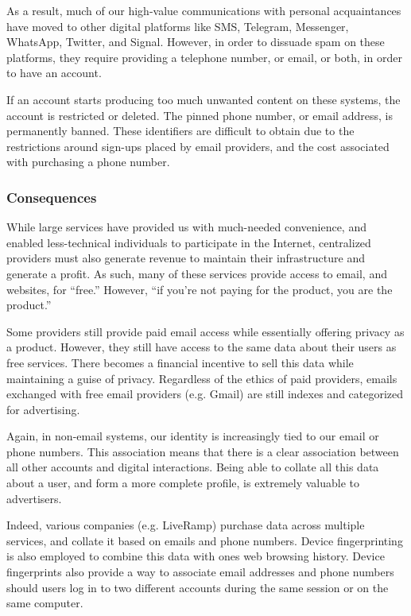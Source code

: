 \documentclass{article}
\begin{document}
As a result, much of our high-value communications with personal acquaintances have moved to other digital platforms like SMS, Telegram, Messenger, WhatsApp, Twitter, and Signal. However, in order to dissuade spam on these platforms, they require providing a telephone number, or email, or both, in order to have an account.

If an account starts producing too much unwanted content on these systems, the account is restricted or deleted. The pinned phone number, or email address, is permanently banned. These identifiers are difficult to obtain due to the restrictions around sign-ups placed by email providers, and the cost associated with purchasing a phone number.

\subsubsection{Consequences}

While large services have provided us with much-needed convenience, and enabled less-technical individuals to participate in the Internet, centralized providers must also generate revenue to maintain their infrastructure and generate a profit. As such, many of these services provide access to email, and websites, for ``free.'' However, ``if you're not paying for the product, you are the product.''

Some providers still provide paid email access while essentially offering privacy as a product. However, they still have access to the same data about their users as free services. There becomes a financial incentive to sell this data while maintaining a guise of privacy. Regardless of the ethics of paid providers, emails exchanged with free email providers (e.g. Gmail) are still indexes and categorized for advertising.

Again, in non-email systems, our identity is increasingly tied to our email or phone numbers. This association means that there is a clear association between all other accounts and digital interactions. Being able to collate all this data about a user, and form a more complete profile, is extremely valuable to advertisers.

Indeed, various companies (e.g. LiveRamp) purchase data across multiple services, and collate it based on emails and phone numbers. Device fingerprinting is also employed to combine this data with ones web browsing history. Device fingerprints also provide a way to associate email addresses and phone numbers should users log in to two different accounts during the same session or on the same computer.
\end{document}
